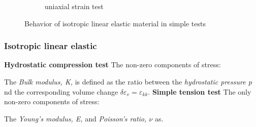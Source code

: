 \documentclass[notes]{beamer}
\begin{document}
\begin{frame}
\begin{figure}[t!]
\begin{subfigure}[t]{0.5\textwidth}
			 \caption{uniaxial strain test}
	    \end{subfigure}
	    \caption{Behavior of isotropic linear elastic material in simple tests}
	\end{figure}
\end{frame}

\begin{frame}
\frametitle{Isotropic linear elastic}
\textbf{Hydrostatic compression test}
The non-zero components of stress: 

The \textit{Bulk modulus, K,}  is defined as the ratio between the \textit{hydrostatic pressure p} nd the corresponding volume change $\delta \varepsilon_v = \varepsilon_{kk}$. 
\textbf{Simple tension test}
The only non-zero components of stress: 

The \textit{Young's modulus, E,}  and \textit{Poisson's ratio, $\nu$} as. 
\end{frame}
\end{document}
